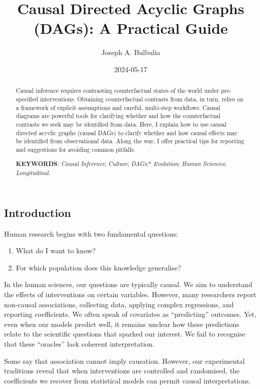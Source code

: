 \documentclass[
  single column]{article}
\title{Causal Directed Acyclic Graphs (DAGs): A Practical Guide}
\author{Joseph A. Bulbulia}
\affil{%
             \small{     Victoria University of Wellington, New Zealand
          ORCID \textcolor[HTML]{A6CE39}{\aiOrcid} ~0000-0002-5861-2056 }
              }
\date{2024-05-17}
\providecommand{\tightlist}{%
  \setlength{\itemsep}{0pt}\setlength{\parskip}{0pt}}\usepackage{longtable,booktabs,array}
\begin{document}
\maketitle
\begin{abstract}
Causal inference requires contrasting counterfactual states of the world
under pre-specified interventions. Obtaining counterfactual contrasts
from data, in turn, relies on a framework of explicit assumptions and
careful, multi-step workflows. Causal diagrams are powerful tools for
clarifying whether and how the counterfactual contrasts we seek may be
identified from data. Here, I explain how to use causal directed acyclic
graphs (causal DAGs) to clarify whether and how causal effects may be
identified from observational data. Along the way, I offer practical
tips for reporting and suggestions for avoiding common pitfalls.

\textbf{KEYWORDS}: \emph{Causal Inference}; \emph{Culture};
\emph{DAGs};* \emph{Evolution}; \emph{Human Sciences};
\emph{Longitudinal}.
\end{abstract}

\subsection{Introduction}\label{introduction}

Human research begins with two fundamental questions:

\begin{enumerate}
\def\labelenumi{\arabic{enumi}.}
\tightlist
\item
  What do I want to know?
\item
  For which population does this knowledge generalise?
\end{enumerate}

In the human sciences, our questions are typically causal. We aim to
understand the effects of interventions on certain variables. However,
many researchers report non-causal associations, collecting data,
applying complex regressions, and reporting coefficients. We often speak
of covariates as ``predicting'' outcomes. Yet, even when our models
predict well, it remains unclear how these predictions relate to the
scientific questions that sparked our interest. We fail to recognise
that these ``oracles'' lack coherent interpretation.

Some say that association cannot imply causation. However, our
experimental traditions reveal that when interventions are controlled
and randomised, the coefficients we recover from statistical models can
permit causal interpretations.
\end{document}
